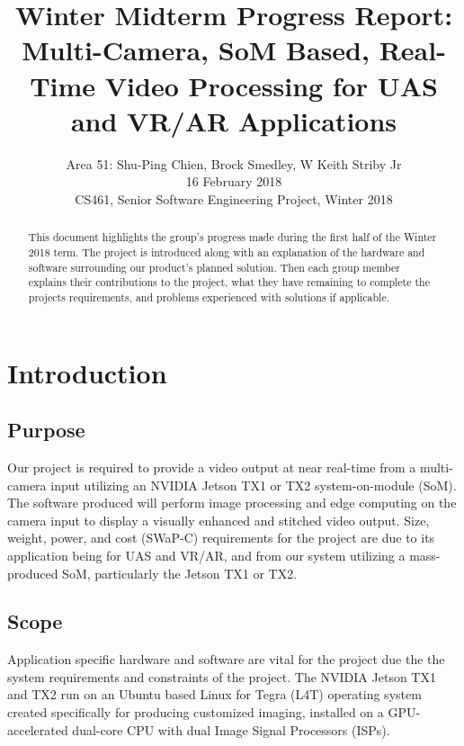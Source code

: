 \documentclass[letterpaper,10pt,serif,draftclsnofoot,onecolumn,compsoc,titlepage]{IEEEtran}
\title{Winter Midterm Progress Report: Multi-Camera, SoM Based, Real-Time Video Processing for UAS and VR/AR Applications}
\author{Area 51: Shu-Ping Chien, Brock Smedley, W Keith Striby Jr \\ 16 February 2018 \\ CS461, Senior Software Engineering Project, Winter 2018}
\begin{document}
\begin{titlepage}
\maketitle

\begin{abstract}

This document highlights the group's progress made during the first half of the 
Winter 2018 term. The project is introduced along with an explanation of the 
hardware and software surrounding our product's planned solution. Then each group member
explains their contributions to the project, what they have remaining to complete
the projects requirements, and problems experienced with solutions if applicable. \\


\thispagestyle{empty}
\end{abstract}
\end{titlepage}

\newpage
\tableofcontents

\newpage

\section{Introduction}

\subsection{Purpose}
Our project is required to provide a video output at near real-time from a 
multi-camera input utilizing an NVIDIA Jetson TX1 or TX2 system-on-module (SoM). 
The software produced will perform image processing and edge computing on the 
camera input to display a visually enhanced and stitched video output. 
Size, weight, power, and cost (SWaP-C) requirements for the project are due 
to its application being for UAS and VR/AR, and from our system utilizing a 
mass-produced SoM, particularly the Jetson TX1 or TX2. \\

\subsection{Scope}
Application specific hardware and software are vital for the project due the the 
system requirements and constraints of the project.
The NVIDIA Jetson TX1 and TX2 run on an Ubuntu based Linux for Tegra (L4T) operating 
system created specifically for producing customized imaging, installed on a 
GPU-accelerated dual-core CPU with dual Image Signal Processors (ISPs). \\
\end{document}
